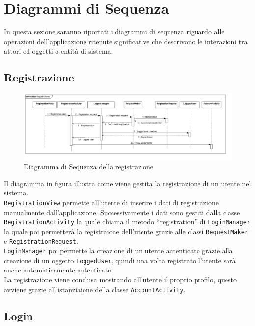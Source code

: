 \section{Diagrammi di Sequenza}
\label{sec:Diagrammi di Sequenza}

In questa sezione saranno riportati i diagrammi di sequenza riguardo alle operazioni dell'applicazione ritenute significative che descrivono le interazioni tra attori ed oggetti o entità di sistema.

\subsection{Registrazione}

\begin{figure}[!h]
	\centering
	\includegraphics[scale=0.35]{img/diagrammiSequenza/registrazione}
	\caption{Diagramma di Sequenza della registrazione}
\end{figure}

Il diagramma in figura illustra come viene gestita la registrazione di un utente nel sistema. \\ \texttt{RegistrationView} permette all'utente di inserire i dati di registrazione manualmente dall'applicazione. Successivamente i dati sono gestiti dalla classe \texttt{RegistrationActivity} la quale chiama il metodo ``registration'' di \texttt{LoginManager} la quale poi permetterà la registraione dell'utente grazie alle classi \texttt{RequestMaker} e \texttt{RegistrationRequest}. \\
\texttt{LoginManager} poi permette la creazione di un utente autenticato grazie alla creazione di un oggetto \texttt{LoggedUser}, quindi una volta registrato l'utente sarà anche automaticamente autenticato. \\ La registrazione viene conclusa mostrando all'utente il proprio profilo, questo avviene grazie all'istanziaione della classe \texttt{AccountActivity}.

\subsection{Login}

